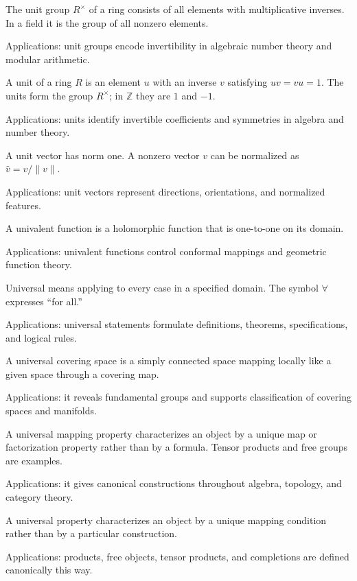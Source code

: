 The unit group $R^\times$ of a ring consists of all elements with multiplicative inverses. In a field it is the group of all nonzero elements. \par\noindent Applications: unit groups encode invertibility in algebraic number theory and modular arithmetic.

A unit of a ring $R$ is an element $u$ with an inverse $v$ satisfying $uv=vu=1$. The units form the group $R^\times$; in $\mathbb Z$ they are $1$ and $-1$. \par\noindent Applications: units identify invertible coefficients and symmetries in algebra and number theory.

A unit vector has norm one. A nonzero vector $v$ can be normalized as $\hat v=v/\|v\|$. \par\noindent Applications: unit vectors represent directions, orientations, and normalized features.

A univalent function is a holomorphic function that is one-to-one on its domain. \par\noindent Applications: univalent functions control conformal mappings and geometric function theory.

Universal means applying to every case in a specified domain. The symbol $\forall$ expresses “for all.” \par\noindent Applications: universal statements formulate definitions, theorems, specifications, and logical rules.

A universal covering space is a simply connected space mapping locally like a given space through a covering map. \par\noindent Applications: it reveals fundamental groups and supports classification of covering spaces and manifolds.

A universal mapping property characterizes an object by a unique map or factorization property rather than by a formula. Tensor products and free groups are examples. \par\noindent Applications: it gives canonical constructions throughout algebra, topology, and category theory.

A universal property characterizes an object by a unique mapping condition rather than by a particular construction. \par\noindent Applications: products, free objects, tensor products, and completions are defined canonically this way.

